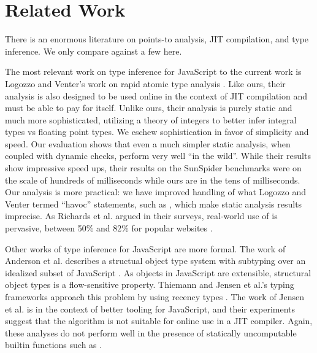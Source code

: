 \section{Related Work}
\label{sec:related-work}

There is an enormous literature on points-to analysis, JIT compilation, and
type inference. We only compare against a few here.

The most relevant work on type inference for JavaScript to the current work is
Logozzo and Venter's work on rapid atomic type analysis \cite{Logozzo10}.
Like ours, their analysis is also designed to be used online in the context of
JIT compilation and must be able to pay for itself. Unlike ours, their
analysis is purely static and much more sophisticated, utilizing a theory of
integers to better infer integral types vs floating point types. We eschew
sophistication in favor of simplicity and speed. Our evaluation shows that
even a much simpler static analysis, when coupled with dynamic checks, perform
very well ``in the wild''. While their results show impressive speed ups,
their results on the SunSpider benchmarks were on the scale of hundreds of
milliseconds while ours are in the tens of milliseconds. Our analysis is more
practical: we have improved handling of what Logozzo and Venter termed ``havoc''
statements, such as , which make static analysis results
imprecise. As Richards et al. argued in their surveys, real-world use of
 is pervasive, between 50\% and 82\% for popular websites
\cite{Richards11, Richards10}.

Other works of type inference for JavaScript are more formal. The work of
Anderson et al. describes a structual object type system with subtyping over
an idealized subset of JavaScript \cite{Anderson05}. As objects in JavaScript
are extensible, structural object types is a flow-sensitive property. Thiemann
and Jensen et al.'s typing frameworks approach this problem by using recency
types \cite{Thiemann05, Jensen09}. The work of Jensen et al. is in the context
of better tooling for JavaScript, and their experiments suggest that the
algorithm is not suitable for online use in a JIT compiler. Again, these
analyses do not perform well in the presence of statically uncomputable
builtin functions such as .

